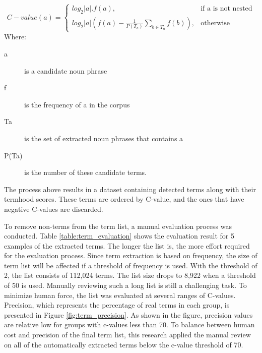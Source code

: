 \documentclass[Journal, InsideFigs, DoubleSpace]{ascelike} %
\begin{document}
\begin{enumerate}
	\begin{equation}
	C-value(a)=
	\begin{cases}
	log_2|a|.f(a), & \text{if a is not nested} \\
	log_2|a|(f(a)-\frac{1}{P(T_a)}\sum_{b\in T_a} f(b)), & \text{otherwise}
	\end{cases}
	\label{eq:cvalue}
	\end{equation}
	Where:
	\begin{description}
		\item[a] is a candidate noun phrase
		\item[f] is the frequency of a in the corpus
		\item[Ta] is the set of extracted noun phrases that contains a
		\item[P(Ta)] is the number of these candidate terms.
	\end{description}
\end{enumerate}
%
\par
The process above results in a dataset containing detected terms along with their termhood scores. These terms are ordered by C-value, and the ones that have negative C-values are discarded. 
\par
To remove non-terms from the term list, a manual evaluation process was conducted. Table \ref{table:term_evaluation} shows the evaluation result for 5 examples of the extracted terms. The longer the list is, the more effort required for the evaluation process. Since term extraction is based on frequency, the size of term list will be affected if a threshold of frequency is used. With the threshold of 2, the list consists of 112,024  terms. The list size drops to 8,922 when a threshold of 50 is used. Manually reviewing such a long list is still a challenging task. To minimize human force, the list was evaluated at several ranges of C-values. Precision, which represents the percentage of real terms in each group, is presented in Figure \ref{fig:term_precision}. As shown in the figure, precision values are relative low for groups with c-values less than 70. To balance between human cost and precision of the final term list, this research applied the manual review on all of the automatically extracted terms below the c-value threshold of 70.
%
\end{document}
